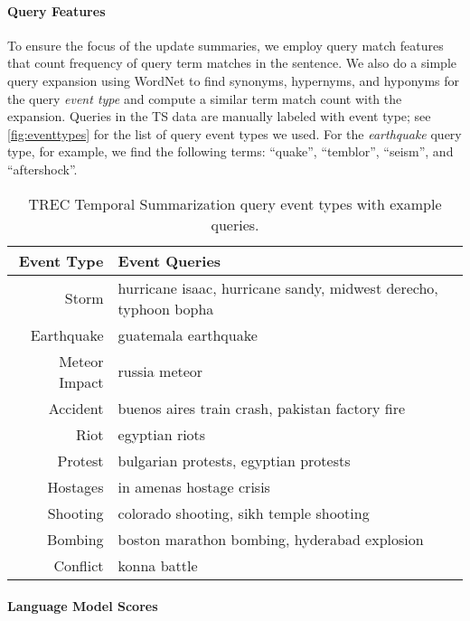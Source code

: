 \paragraph{Query Features} To ensure the focus of the update summaries,
we employ query match features that count frequency of query term matches
in the sentence. We also do a simple query expansion using WordNet 
\citep{miller1995wordnet}
to find  synonyms, hypernyms, and hyponyms for the query \textit{event type}
and compute
a similar term match count with the expansion.
Queries in the TS data are manually labeled with event type;
see \autoref{fig:eventtypes} for the list of query event types we used. 
For the \emph{earthquake} query type, for example, we find the following terms:
``quake'', ``temblor'', ``seism'', and ``aftershock''.


\begin{table}
\begin{tabular}{r | l}
\textbf{Event Type} & \textbf{Event Queries} \\
\hline
Storm & hurricane isaac, hurricane sandy, midwest derecho, typhoon bopha\\
Earthquake & guatemala earthquake  \\
Meteor Impact & russia meteor \\
Accident & buenos aires train crash,  pakistan factory fire\\
Riot & egyptian riots\\
Protest & bulgarian protests, egyptian protests \\
Hostages & in amenas hostage crisis \\
Shooting & colorado shooting, sikh temple shooting\\
Bombing & boston marathon bombing, hyderabad explosion \\
Conflict & konna battle \\
\end{tabular}
\caption{TREC Temporal Summarization query event types with example queries.} 
\label{fig:eventtypes}
\end{table}

\paragraph{Language Model Scores}

